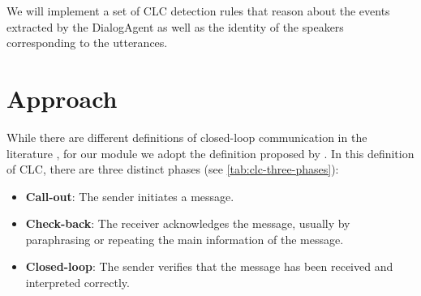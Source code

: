 We will implement a set of CLC detection rules that reason about the events
extracted by the DialogAgent as well as the identity of the speakers
corresponding to the utterances.


\section{Approach}

While there are different definitions of closed-loop communication in the
literature \cite{abd2018closed, yee2017role}, for our module we adopt the
definition proposed by \citet{Hargestam.ea:2013}.  In this definition of CLC,
there are three distinct phases (see \autoref{tab:clc-three-phases}): 

\begin{itemize}

    \item \textbf{Call-out}: The sender initiates a message.

    \item \textbf{Check-back}: The receiver acknowledges the message, usually
        by paraphrasing or repeating the main information of the message.

    \item \textbf{Closed-loop}: The sender verifies that the message has been
                received and interpreted correctly.

\end{itemize}

\newcommand{\utteranceone}{\textit{This is Green. I’m finishing this side, blue, could you check the central for victims? }} 
\newcommand{\utterancetwo}{\textit{This is Blue. Okay. I’ll go check the central for victims.}}
\newcommand{\utterancethree}{\textit{All right, thank you, Blue.}}

